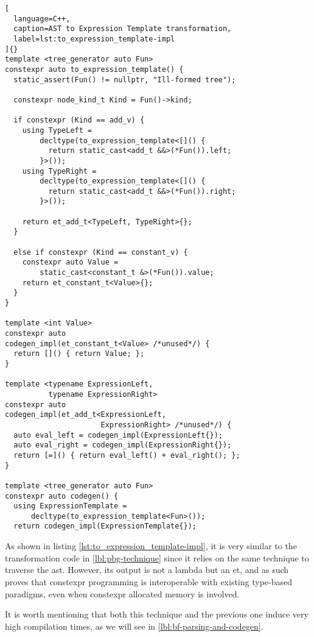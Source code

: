 \documentclass[../main]{subfiles}
\begin{document}
\clearpage%

\begin{lstlisting}[
  language=C++,
  caption=AST to Expression Template transformation,
  label=lst:to_expression_template-impl
]{}
template <tree_generator auto Fun>
constexpr auto to_expression_template() {
  static_assert(Fun() != nullptr, "Ill-formed tree");

  constexpr node_kind_t Kind = Fun()->kind;

  if constexpr (Kind == add_v) {
    using TypeLeft =
        decltype(to_expression_template<[]() {
          return static_cast<add_t &&>(*Fun()).left;
        }>());
    using TypeRight =
        decltype(to_expression_template<[]() {
          return static_cast<add_t &&>(*Fun()).right;
        }>());

    return et_add_t<TypeLeft, TypeRight>{};
  }

  else if constexpr (Kind == constant_v) {
    constexpr auto Value =
        static_cast<constant_t &>(*Fun()).value;
    return et_constant_t<Value>{};
  }
}

template <int Value>
constexpr auto
codegen_impl(et_constant_t<Value> /*unused*/) {
  return []() { return Value; };
}

template <typename ExpressionLeft,
          typename ExpressionRight>
constexpr auto
codegen_impl(et_add_t<ExpressionLeft,
                      ExpressionRight> /*unused*/) {
  auto eval_left = codegen_impl(ExpressionLeft{});
  auto eval_right = codegen_impl(ExpressionRight{});
  return [=]() { return eval_left() + eval_right(); };
}

template <tree_generator auto Fun>
constexpr auto codegen() {
  using ExpressionTemplate =
      decltype(to_expression_template<Fun>());
  return codegen_impl(ExpressionTemplate{});
\end{lstlisting}

\clearpage%

As shown in listing \ref{lst:to_expression_template-impl}, it is very similar
to the transformation code in \ref{lbl:pbg-technique} since it relies on
the same technique to traverse the \gls{ast}.
However, its output is not a \cpp lambda but an \gls{et}, and as such
proves that \gls{constexpr} programming is interoperable with existing
type-based paradigms, even when \gls{constexpr} allocated memory is involved.

It is worth mentioning that both this technique and the previous one induce
very high compilation times, as we will see in \ref{lbl:bf-parsing-and-codegen}.
\end{document}
